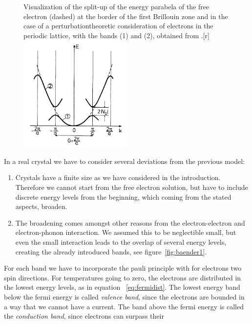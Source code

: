 \begin{figure}[!t]
  \begin{captionbeside}[]{
          Visualization of the split-up of the energy parabela of the free electron (dashed)
          at the border of the first Brillouin zone and in the case of a perturbationtheoretic
          consideration of electrons in the periodic lattice, with the bands (1) and (2),
obtained from \cite{ibach2009festkorperphysik}.}[r]
    \includegraphics[width=0.5\textwidth]{figures/bloch}
  \end{captionbeside}
  \label{fig:bloch}
\end{figure}
\newpage
In a real crystal we have to consider several deviations from the previous model:
\begin{enumerate}
    \item Crystals have a finite size as we have considered in the introduction. Therefore
        we cannot start from the free electron solution, but have to include discrete energy 
        levels from the beginning, which coming from the stated aspects, broaden.
    \item The broadening comes amongst other reasons from the electron-electron and 
        electron-phonon interaction. We assumed this to be neglectible small, but even
        the small interaction leads to the overlap of several energy levels, creating
        the already introduced bands, see figure~\ref{fig:baender1}.
\end{enumerate}
For each band we have to incorporate the pauli principle with for electrons two spin directions.
For temperatures going to zero, the electrons are distributed in the lowest energy levels, as in
equation ~\ref{eq:fermidist}. The lowest energy band below the fermi energy is called
\emph{valence band}, since the electrons are bounded in a way that we cannot have a current.
The band above the fermi energy is called the \emph{conduction band}, since electrons can surpass their
